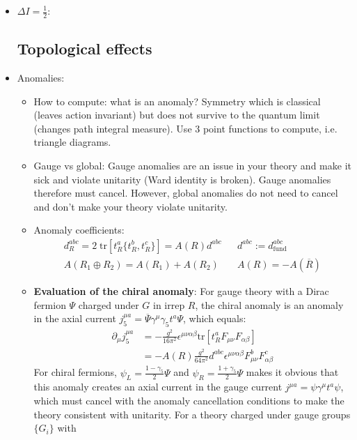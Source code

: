 \documentclass[11pt, oneside]{article}   	%
\theoremstyle{definition}
\numberwithin{equation}{subsection}		%
\begin{document}
\begin{itemize}
	
	\item $\Delta I = \frac{1}{2}$: 
	
	\newpage
	\subsection{Topological effects}
	
	\item Anomalies: 
	\begin{itemize}
		\item How to compute: what is an anomaly? Symmetry which is classical (leaves action invariant) but does not survive to the 
		quantum limit (changes path integral measure). Use 3 point functions to compute, i.e. triangle diagrams. 
		\item Gauge vs global: Gauge anomalies are an issue in your theory and make it sick and violate unitarity (Ward identity is 
		broken). Gauge anomalies therefore must cancel. However, global anomalies do not need to cancel and don't make your theory 
		violate unitarity. 
		\item Anomaly coefficients: 
		\begin{align}
			d_R^{abc} = 2\;\mathrm{tr}\left[t^a_R \{t_R^b, t_R^c\}\right]= A(R) d^{abc} && d^{abc} := d_\mathrm{fund}^{abc}
			\\
			A(R_1\oplus R_2) = A(R_1) + A(R_2) && A(R) = - A(\overline R)
		\end{align}
		\item \textbf{Evaluation of the chiral anomaly}: For gauge theory with a Dirac fermion $\Psi$ charged under $G$ in irrep $R$, the 
		chiral anomaly is an anomaly in the axial current $j_5^{\mu a} = \overline \Psi \gamma^\mu \gamma_5 t^a\Psi$, which 
		equals:
		\begin{align}
			\partial_\mu j^{\mu a}_5 &= -\frac{g^2}{16\pi^2} \epsilon^{\mu\nu\alpha\beta} \mathrm{tr}\left[ t_R^a F_{\mu\nu} 
			F_{\alpha\beta} \right] \\
			&= - A(R) \frac{g^2}{64\pi^2} d^{abc} \epsilon^{\mu\nu\alpha\beta} F_{\mu\nu}^b F_{\alpha\beta}^c
		\end{align}
		For chiral fermions, $\psi_L = \frac{1 - \gamma_5}{2}\Psi$ and $\psi_R = \frac{1 + \gamma_5}{2}\Psi$ makes it obvious that this 
		anomaly creates an axial current in the gauge current $j^{\mu a} = \psi\gamma^\mu t^a\psi$, which must cancel with the anomaly 
		cancellation conditions to make the theory consistent with unitarity. For a theory charged under gauge groups $\{G_i\}$ with 

\end{itemize}
\end{itemize}
\end{document}
